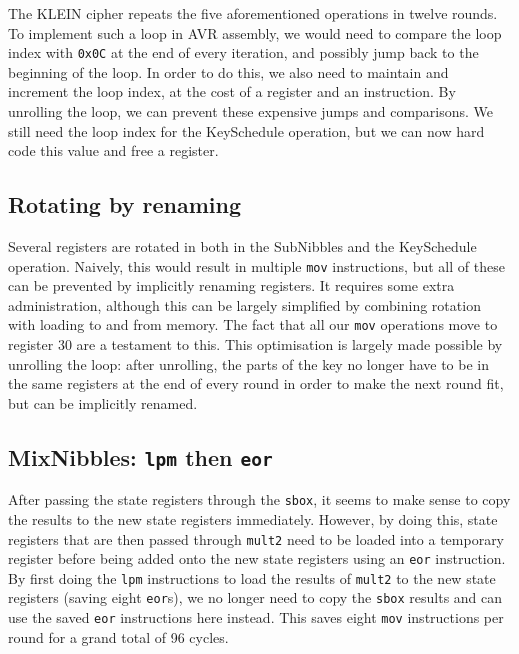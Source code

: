 \documentclass[a4paper]{article}
\begin{document}
The KLEIN cipher repeats the five aforementioned operations in twelve rounds. To implement such a loop in AVR assembly, we would need to compare the loop index with \texttt{0x0C} at the end of every iteration, and possibly jump back to the beginning of the loop. In order to do this, we also need to maintain and increment the loop index, at the cost of a register and an instruction. By unrolling the loop, we can prevent these expensive jumps and comparisons. We still need the loop index for the KeySchedule operation, but we can now hard code this value and free a register.

\subsection*{Rotating by renaming}

Several registers are rotated in both in the SubNibbles and the KeySchedule operation. Naively, this would result in multiple \texttt{mov} instructions, but all of these can be prevented by implicitly renaming registers. It requires some extra administration, although this can be largely simplified by combining rotation with loading to and from memory. The fact that all our \texttt{mov} operations move to register 30 are a testament to this. This optimisation is largely made possible by unrolling the loop: after unrolling, the parts of the key no longer have to be in the same registers at the end of every round in order to make the next round fit, but can be implicitly renamed.

\hypertarget{lpmtheneor}{}
\subsection*{MixNibbles: \texttt{lpm} then \texttt{eor}}

After passing the state registers through the \texttt{sbox}, it seems to make sense to copy the results to the new state registers immediately. However, by doing this, state registers that are then passed through \texttt{mult2} need to be loaded into a temporary register before being added onto the new state registers using an \texttt{eor} instruction. By first doing the \texttt{lpm} instructions to load the results of \texttt{mult2} to the new state registers (saving eight \texttt{eor}s), we no longer need to copy the \texttt{sbox} results and can use the saved \texttt{eor} instructions here instead. This saves eight \texttt{mov} instructions per round for a grand total of 96 cycles.
\end{document}
